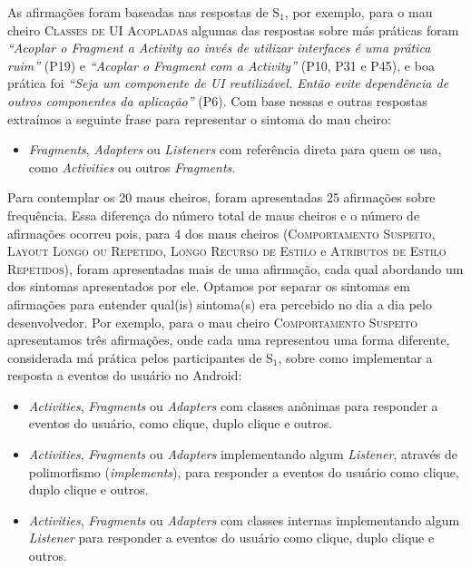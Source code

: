 As afirmações foram baseadas nas respostas de S$_1$, por exemplo, para o mau cheiro \textsc{\small Classes de UI Acopladas} algumas das respostas sobre más práticas foram \textit{``Acoplar o \textit{Fragment} a \textit{Activity} ao invés de utilizar interfaces é uma prática ruim''} (P19) e \textit{``Acoplar o \textit{Fragment} com a \textit{Activity}''} (P10, P31 e P45), e boa prática foi \textit{``Seja um componente de UI reutilizável. Então evite dependência de outros componentes da aplicação''} (P6). Com base nessas e outras respostas extraímos a seguinte frase para representar o sintoma do mau cheiro:

\begin{itemize}
 \item \textit{Fragments}, \textit{Adapters} ou \textit{Listeners} com referência direta para quem os usa, como \textit{Activities} ou outros \textit{Fragments}.
\end{itemize}

Para contemplar os 20 maus cheiros, foram apresentadas 25 afirmações sobre frequência. Essa diferença do número total de maus cheiros e o número de afirmações ocorreu pois, para 4 dos maus cheiros (\textsc{\small Comportamento Suspeito}, \textsc{\small Layout Longo ou Repetido}, \textsc{\small Longo Recurso de Estilo} e \textsc{\small Atributos de Estilo Repetidos}), foram apresentadas mais de uma afirmação, cada qual abordando um dos sintomas apresentados por ele. Optamos por separar os sintomas em afirmações para entender qual(is) sintoma(s) era percebido no dia a dia pelo desenvolvedor. Por exemplo, para o mau cheiro \textsc{\small Comportamento Suspeito} apresentamos três afirmações, onde cada uma representou uma forma diferente, considerada má prática pelos participantes de S$_1$, sobre como implementar a resposta a eventos do usuário no Android:

\begin{itemize}
  \item \textit{Activities}, \textit{Fragments} ou \textit{Adapters} com classes anônimas para responder a eventos do usuário, como clique, duplo clique e outros.

  \item \textit{Activities}, \textit{Fragments} ou \textit{Adapters} implementando algum \textit{Listener}, através de polimorfismo (\textit{implements}), para responder a eventos do usuário como clique, duplo clique e outros.

  \item \textit{Activities}, \textit{Fragments} ou \textit{Adapters} com classes internas implementando algum \textit{Listener} para responder a eventos do usuário como clique, duplo clique e outros.
\end{itemize}


